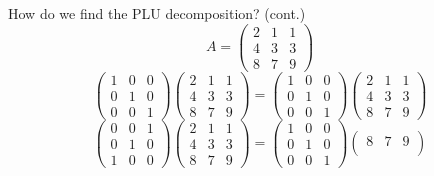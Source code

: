 \documentclass[handout]{beamer}
\begin{document}
\begin{frame}{How do we find the PLU decomposition? (cont.)}
\[A=
\begin{pmatrix}{}
                2 & 1 & 1 \\
                4 & 3 & 3 \\
                8 & 7 & 9
            \end{pmatrix}
            \]
            \[
  \begin{pmatrix}{}
                1 & 0 & 0 \\
                0 & 1 & 0 \\
                0 & 0 & 1
            \end{pmatrix}\begin{pmatrix}{}
                2 & 1 & 1 \\
                4 & 3 & 3 \\
                8 & 7 & 9
            \end{pmatrix}
            =\begin{pmatrix}{}
                1 & 0 & 0 \\
                0 & 1 & 0 \\
                0 & 0 & 1
            \end{pmatrix}
            \begin{pmatrix}{}
                2 & 1 & 1 \\
                4 & 3 & 3 \\
                8 & 7 & 9
            \end{pmatrix}
            \]
            \[
  \begin{pmatrix}{}
                0 & 0 & 1 \\
                0 & 1 & 0 \\
                1 & 0 & 0
            \end{pmatrix}\begin{pmatrix}{}
                2 & 1 & 1 \\
                4 & 3 & 3 \\
                8 & 7 & 9
            \end{pmatrix}
            =\begin{pmatrix}{}
                1 & 0 & 0 \\
                0 & 1 & 0 \\
                0 & 0 & 1
            \end{pmatrix}
            \begin{pmatrix}{}
                8 & 7 & 9 \\

\end{pmatrix}\]
\end{frame}
\end{document}
